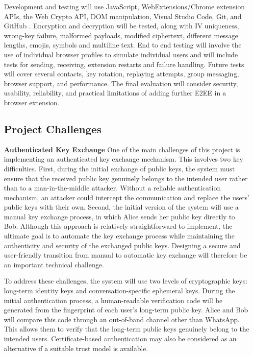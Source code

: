 \documentclass[11pt]{article}
\begin{document}
Development and testing will use JavaScript, WebExtensions/Chrome extension APIs, the Web Crypto API, DOM manipulation, Visual Studio Code, Git, and GitHub \cite{chrome-extension-security}. Encryption and decryption will be tested, along with IV uniqueness, wrong-key failure, malformed payloads, modified ciphertext, different message lengths, emojis, symbols and multiline text. End to end testing will involve the use of individual browser profiles to simulate individual users and will include tests for sending, receiving, extension restarts and failure handling. Future tests will cover several contacts, key rotation, replaying attempts, group messaging, browser support, and performance. The final evaluation will consider security, usability, reliability, and practical limitations of adding further E2EE in a browser extension.

\subsection{Project Challenges}
 \textbf{Authenticated Key Exchange}
 One of the main challenges of this project is implementing an authenticated key exchange mechanism. This involves two key difficulties. First, during the initial exchange of public keys, the system must ensure that the received public key genuinely belongs to the intended user rather than to a man-in-the-middle attacker. Without a reliable authentication mechanism, an attacker could intercept the communication and replace the users’ public keys with their own.
 Second, the initial version of the system will use a manual key exchange process, in which Alice sends her public key directly to Bob. Although this approach is relatively straightforward to implement, the ultimate goal is to automate the key exchange process while maintaining the authenticity and security of the exchanged public keys. Designing a secure and user-friendly transition from manual to automatic key exchange will therefore be an important technical challenge.

 To address these challenges, the system will use two levels of cryptographic keys: long-term identity keys and conversation-specific ephemeral keys. During the initial authentication process, a human-readable verification code will be generated from the fingerprint of each user’s long-term public key. Alice and Bob will compare this code through an out-of-band channel other than WhatsApp. This allows them to verify that the long-term public keys genuinely belong to the intended users. Certificate-based authentication may also be considered as an alternative if a suitable trust model is available.
\end{document}
